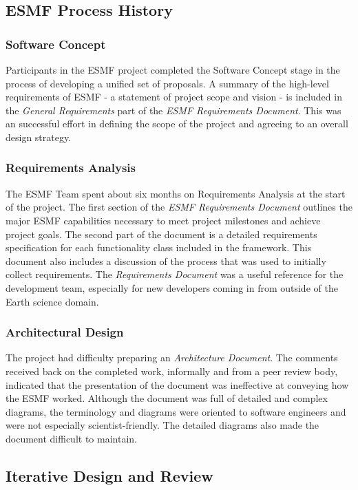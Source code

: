 \subsection{ESMF Process History}

\subsubsection{Software Concept}
Participants in the ESMF project completed the Software Concept
stage in the process of developing a unified set of proposals.
A summary of the high-level requirements of ESMF - a statement of project
scope and vision - is included in the {\it General Requirements}
part of the {\it ESMF Requirements Document}\cite{bib:ESMFreqdoc}.
This was an successful effort in defining the scope of the project
and agreeing to an overall design strategy.

\subsubsection {Requirements Analysis}
The ESMF Team spent about six months on Requirements Analysis at
the start of the project.
The first section of the {\it ESMF Requirements Document} outlines 
the major ESMF capabilities necessary to meet project milestones and achieve 
project goals.  The second part of the document is a detailed 
requirements specification for each functionality class included in 
the framework.  This document also includes a discussion of the 
process that was used to initially collect requirements.
The {\it Requirements Document} was a useful reference for the development
team, especially for new developers coming in from outside of the
Earth science domain.

\subsubsection{Architectural Design}
The project had difficulty preparing an {\it Architecture Document}.  
The comments received back on the completed work, informally and
from a peer review body, indicated that the presentation of the document
was ineffective at conveying how the ESMF worked. Although the
document was full of detailed and complex diagrams, the terminology and
diagrams were oriented to software engineers and were not especially
scientist-friendly.  The detailed diagrams also made the document difficult
to maintain.  

\subsection{Iterative Design and Review}

